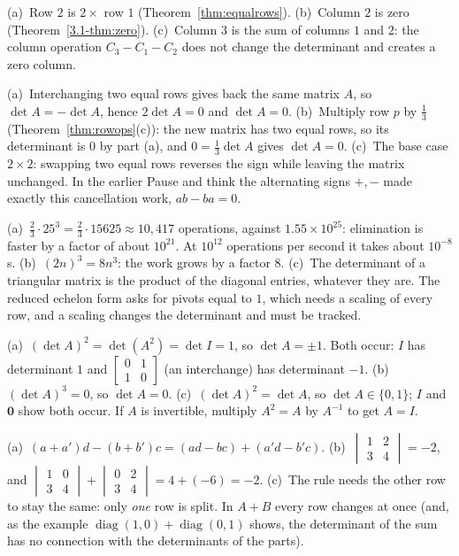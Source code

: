 \documentclass[11pt]{article}
\begin{document}
\begin{description}[leftmargin=0pt,itemsep=5pt]
  \item[Knowledge Check \ref{kc:zero}.] (a)~Row $2$ is $2\times$ row $1$ (Theorem~\ref{thm:equalrows}). (b)~Column $2$ is zero (Theorem~\ref{3.1-thm:zero}). (c)~Column $3$ is the sum of columns $1$ and $2$: the column operation $C_3-C_1-C_2$ does not change the determinant and creates a zero column.
  \item[Pause and think \ref{think:swap}.] (a)~Interchanging two equal rows gives back the same matrix $A$, so $\det A=-\det A$, hence $2\det A=0$ and $\det A=0$. (b)~Multiply row $p$ by $\tfrac13$ (Theorem~\ref{thm:rowops}(c)): the new matrix has two equal rows, so its determinant is $0$ by part (a), and $0=\tfrac13\det A$ gives $\det A=0$. (c)~The base case $2\times2$: swapping two equal rows reverses the sign while leaving the matrix unchanged. In the earlier Pause and think the alternating signs $+,-$ made exactly this cancellation work, $ab-ba=0$.
  \item[Pause and think \ref{think:cost}.] (a)~$\tfrac23\cdot25^3=\tfrac23\cdot15625\approx10{,}417$ operations, against $1.55\times10^{25}$: elimination is faster by a factor of about $10^{21}$. At $10^{12}$ operations per second it takes about $10^{-8}$ s. (b)~$(2n)^3=8n^3$: the work grows by a factor $8$. (c)~The determinant of a triangular matrix is the product of the diagonal entries, whatever they are. The reduced echelon form asks for pivots equal to $1$, which needs a scaling of every row, and a scaling changes the determinant and must be tracked.
  \item[Pause and think \ref{think:squares}.] (a)~$(\det A)^2=\det(A^2)=\det I=1$, so $\det A=\pm1$. Both occur: $I$ has determinant $1$ and $\begin{bmatrix}0&1\\1&0\end{bmatrix}$ (an interchange) has determinant $-1$. (b)~$(\det A)^3=0$, so $\det A=0$. (c)~$(\det A)^2=\det A$, so $\det A\in\{0,1\}$; $I$ and $\mathbf{0}$ show both occur. If $A$ is invertible, multiply $A^2=A$ by $A^{-1}$ to get $A=I$.
  \item[Pause and think \ref{think:rowlinear}.] (a)~$(a+a')d-(b+b')c=(ad-bc)+(a'd-b'c)$. (b)~$\begin{vmatrix}1&2\\3&4\end{vmatrix}=-2$, and $\begin{vmatrix}1&0\\3&4\end{vmatrix}+\begin{vmatrix}0&2\\3&4\end{vmatrix}=4+(-6)=-2$. (c)~The rule needs the other row to stay the same: only \emph{one} row is split. In $A+B$ every row changes at once (and, as the example $\operatorname{diag}(1,0)+\operatorname{diag}(0,1)$ shows, the determinant of the sum has no connection with the determinants of the parts).

\end{description}
\end{document}
